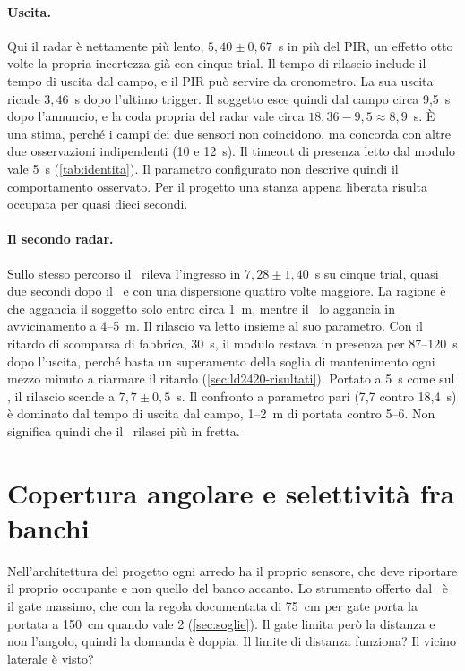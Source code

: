 \paragraph{Uscita.} Qui il radar è nettamente più lento, $5{,}40 \pm 0{,}67$~s in
più del PIR, un effetto otto volte la propria incertezza già con cinque trial. Il
tempo di rilascio include il tempo di uscita dal campo, e il PIR può servire da
cronometro. La sua uscita ricade $3{,}46$~s dopo l'ultimo trigger. Il soggetto esce
quindi dal campo circa 9,5~s dopo l'annuncio, e la coda propria del radar vale circa
$18{,}36 - 9{,}5 \approx 8{,}9$~s. È una stima, perché i campi dei due sensori non
coincidono, ma concorda con altre due osservazioni indipendenti (10 e 12~s). Il
timeout di presenza letto dal modulo vale 5~s (\cref{tab:identita}). Il parametro
configurato non descrive quindi il comportamento osservato. Per il progetto una
stanza appena liberata risulta occupata per quasi dieci secondi.

\paragraph{Il secondo radar.} Sullo stesso percorso il \ldc\ rileva l'ingresso in
$7{,}28 \pm 1{,}40$~s su cinque trial, quasi due secondi dopo il \ldb\ e con una
dispersione quattro volte maggiore. La ragione è che aggancia il soggetto solo entro
circa 1~m, mentre il \ldb\ lo aggancia in avvicinamento a 4--5~m. Il rilascio va
letto insieme al suo parametro. Con il ritardo di scomparsa di fabbrica, 30~s, il
modulo restava in presenza per 87--120~s dopo l'uscita, perché basta un superamento
della soglia di mantenimento ogni mezzo minuto a riarmare il ritardo
(\cref{sec:ld2420-risultati}). Portato a 5~s come sul \ldb, il rilascio scende a
$7{,}7 \pm 0{,}5$~s. Il confronto a parametro pari (7,7 contro 18,4~s) è dominato dal
tempo di uscita dal campo, 1--2~m di portata contro 5--6. Non significa quindi che il
\ldc\ rilasci più in fretta.

\section{Copertura angolare e selettività fra banchi}
\label{sec:angolare}
\label{sec:selettivita}

Nell'architettura del progetto ogni arredo ha il proprio sensore, che deve riportare
il proprio occupante e non quello del banco accanto. Lo strumento offerto dal \ldb\ è
il gate massimo, che con la regola documentata di 75~cm per gate porta la portata a
150~cm quando vale 2 (\cref{sec:soglie}). Il gate limita però la distanza e non
l'angolo, quindi la domanda è doppia. Il limite di distanza funziona? Il vicino
laterale è visto?

